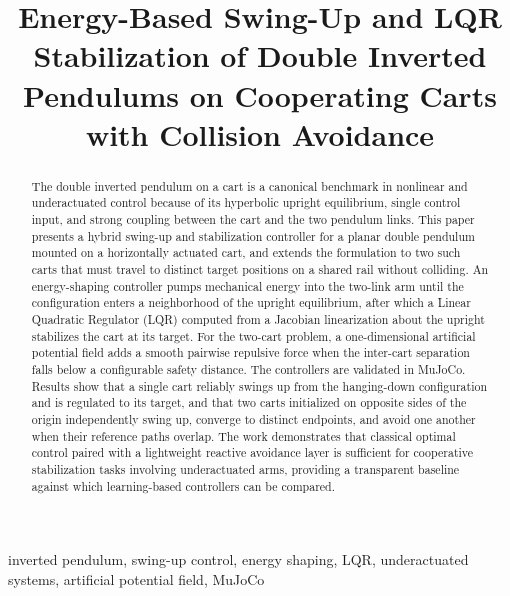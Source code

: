\documentclass[conference]{IEEEtran}
\begin{document}
\title{Energy-Based Swing-Up and LQR Stabilization of Double Inverted Pendulums on Cooperating Carts with Collision Avoidance}

\author{
}

\maketitle

\begin{abstract}
The double inverted pendulum on a cart is a canonical benchmark in nonlinear and underactuated control because of its hyperbolic upright equilibrium, single control input, and strong coupling between the cart and the two pendulum links. This paper presents a hybrid swing-up and stabilization controller for a planar double pendulum mounted on a horizontally actuated cart, and extends the formulation to two such carts that must travel to distinct target positions on a shared rail without colliding. An energy-shaping controller pumps mechanical energy into the two-link arm until the configuration enters a neighborhood of the upright equilibrium, after which a Linear Quadratic Regulator (LQR) computed from a Jacobian linearization about the upright stabilizes the cart at its target. For the two-cart problem, a one-dimensional artificial potential field adds a smooth pairwise repulsive force when the inter-cart separation falls below a configurable safety distance. The controllers are validated in MuJoCo. Results show that a single cart reliably swings up from the hanging-down configuration and is regulated to its target, and that two carts initialized on opposite sides of the origin independently swing up, converge to distinct endpoints, and avoid one another when their reference paths overlap. The work demonstrates that classical optimal control paired with a lightweight reactive avoidance layer is sufficient for cooperative stabilization tasks involving underactuated arms, providing a transparent baseline against which learning-based controllers can be compared.
\end{abstract}

\begin{IEEEkeywords}
inverted pendulum, swing-up control, energy shaping, LQR, underactuated systems, artificial potential field, MuJoCo
\end{IEEEkeywords}
\end{document}
